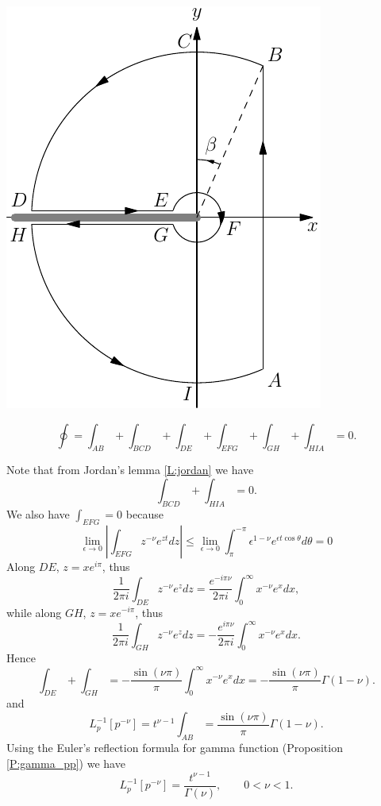 \begin{marginfigure} \label{F:cont2}
  \includegraphics{graphics/contour.pdf}
\end{marginfigure}

\[
  \oint = \int_{AB} + \int_{BCD} + \int_{DE} + \int_{EFG} + \int_{GH}
          + \int_{HIA} = 0.
\]

Note that from Jordan's lemma \ref{L:jordan} we have 
\[
  \int_{BCD}  + \int_{HIA} = 0.
\]
We also have $\int_{EFG}=0$ because
\[
  \lim_{\epsilon\to 0} |\int_{EFG} z^{-\nu} e^{z t} dz|
    \le \lim_{\epsilon\to 0} \int_{\pi}^{-\pi} \epsilon^{1-\nu} e^{\epsilon
        t\cos \theta} d\theta 
    = 0
\]
Along $DE$, $z=x e^{i\pi}$, thus
\[
  \frac{1}{2\pi i} \int_{DE} z^{-\nu} e^z dz
    = \frac{e^{-i\pi\nu}}{2\pi i} \int_0^{\infty} x^{-\nu} e^x dx,
\]
while along $GH$, $z=x e^{-i\pi}$, thus
\[
  \frac{1}{2\pi i} \int_{GH} z^{-\nu} e^z dz
    = - \frac{e^{i\pi\nu}}{2\pi i} \int_0^{\infty} x^{-\nu} e^x dx.
\]
Hence
\[
  \int_{DE} + \int_{GH}
    = - \frac{\sin(\nu\pi)}{\pi} \int_0^{\infty} x^{-\nu} e^x dx
    = - \frac{\sin(\nu\pi)}{\pi} \Gamma(1-\nu).
\]
and 
\[
  L_p^{-1} \left[ p^{-\nu} \right] = t^{\nu-1} \int_{AB}
    = \frac{\sin(\nu\pi)}{\pi} \Gamma(1-\nu).
\]
Using the Euler's reflection formula for gamma function (Proposition
\ref{P:gamma_pp}) we have
\begin{equation}
  L_p^{-1} \left[ p^{-\nu} \right] 
    = \frac{t^{\nu-1}}{\Gamma(\nu)}, \qquad 0<\nu<1.
\end{equation}

